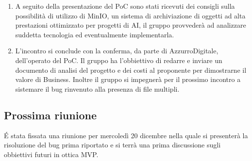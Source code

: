 \begin{enumerate}
    \item A seguito della presentazione del PoC sono stati ricevuti dei consigli sulla possibilità di utilizzo di MinIO, un sistema di archiviazione di oggetti ad alta prestazioni ottimizzato per progetti di AI, il gruppo provvederà ad analizzare suddetta tecnologia ed eventualmente implementarla.
    \item L'incontro si conclude con la conferma, da parte di AzzurroDigitale, dell'operato del PoC. Il gruppo ha l'obbiettivo di redarre e inviare un documento di analisi del progetto e dei costi al proponente per dimostrarne il valore di Business. Inoltre il gruppo si impegnerà per il prossimo incontro a sistemare il bug rinvenuto alla presenza di file multipli. 
\end{enumerate}

\subsection{Prossima riunione} \label{subsec:riunione}
É stata fissata una riunione per mercoledì 20 dicembre nella quale si presenterà la risoluzione del bug prima riportato e si terrà una prima discussione sugli obbiettivi futuri in ottica MVP.
